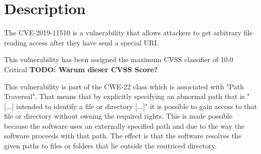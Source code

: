 

\section{Description}
\label{description}
The CVE-2019-11510 is a vulnerability that allows attackers to get arbitrary file reading access after they have send a special URI.\autocite{NVDCVE:online}

This vulnerability has been assigned the maximum CVSS classifier of 10.0 Critical\autocite{AWAKE:online} \textbf{TODO: Warum dieser CVSS Score?}

This vulnerability is part of the CWE-22 class which is associated with "Path Traversal". That means that by explicitly specifying an abnormal path that is "[...] intended to identify a file or directory [...]" \autocite{CWE22-Definition:online} it is possible to gain access to that file or directory without owning the required rights. This is made possible because the software uses an externally specified path and due to the way the software proceeds with that path. The effect is that the software resolves the given paths to files or folders that lie outside the resitriced directory.\autocite{CWE22-Definition:online}

